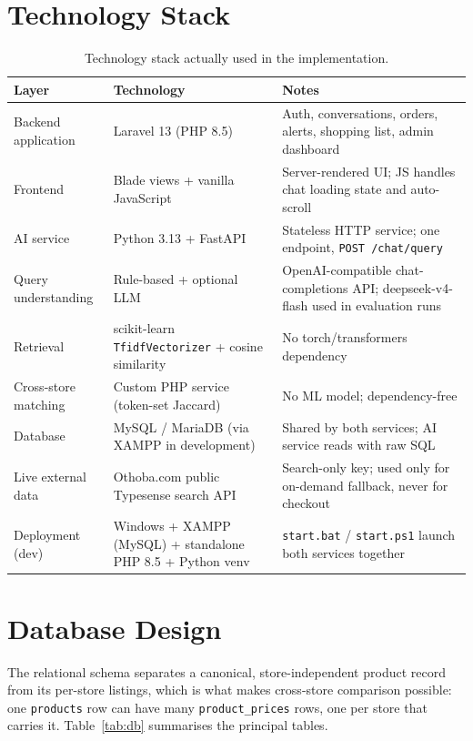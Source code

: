 \documentclass[12pt,a4paper]{report}
\begin{document}
\section{Technology Stack}
\begin{table}[H]
\centering
\small
\begin{tabular}{p{2.6cm}p{4.6cm}p{5.6cm}}
\toprule
\textbf{Layer} & \textbf{Technology} & \textbf{Notes} \\
\midrule
Backend application & Laravel 13 (PHP 8.5) & Auth, conversations, orders, alerts, shopping list, admin
dashboard \\
Frontend & Blade views + vanilla JavaScript & Server-rendered UI; JS handles chat loading state and
auto-scroll \\
AI service & Python 3.13 + FastAPI & Stateless HTTP service; one endpoint, \texttt{POST /chat/query} \\
Query understanding & Rule-based + optional LLM & OpenAI-compatible chat-completions API;
deepseek-v4-flash used in evaluation runs \\
Retrieval & scikit-learn \texttt{TfidfVectorizer} + cosine similarity & No torch/transformers dependency \\
Cross-store matching & Custom PHP service (token-set Jaccard) & No ML model; dependency-free \\
Database & MySQL / MariaDB (via XAMPP in development) & Shared by both services; AI service reads with
raw SQL \\
Live external data & Othoba.com public Typesense search API & Search-only key; used only for on-demand
fallback, never for checkout \\
Deployment (dev) & Windows + XAMPP (MySQL) + standalone PHP 8.5 + Python venv & \texttt{start.bat} /
\texttt{start.ps1} launch both services together \\
\bottomrule
\end{tabular}
\caption{Technology stack actually used in the implementation.}
\end{table}

\section{Database Design}
The relational schema separates a canonical, store-independent product record from its per-store
listings, which is what makes cross-store comparison possible: one \texttt{products} row can have many
\texttt{product\_prices} rows, one per store that carries it. Table~\ref{tab:db} summarises the principal
tables.
\end{document}
